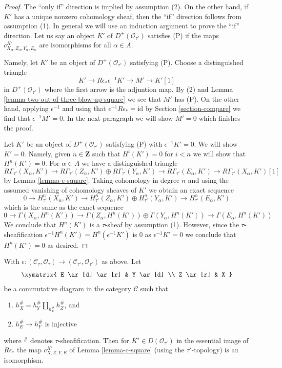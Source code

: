 \begin{proof}
The ``only if'' direction is implied by assumption (2).
On the other hand, if $K'$ has a unique nonzero cohomology sheaf,
then the ``if'' direction follows from assumption (1).
In general we will use an induction argument to prove the
``if'' direction. Let us say an object $K'$ of $D^+(\mathcal{O}_{\tau'})$
satisfies (P) if the maps $c^{K'}_{X_\alpha, Z_\alpha, Y_\alpha, E_\alpha}$
are isomorphisms for all $\alpha \in A$.

\medskip\noindent
Namely, let $K'$ be an object of $D^+(\mathcal{O}_{\tau'})$
satisfying (P). Choose a distinguished triangle
$$
K' \to R\epsilon_*\epsilon^{-1}K' \to M' \to K'[1]
$$
in $D^+(\mathcal{O}_{\tau'})$ where the first arrow is the adjuntion map.
By (2) and Lemma \ref{lemma-two-out-of-three-blow-up-square}
we see that $M'$ has (P). On the other hand, applying
$\epsilon^{-1}$ and using that $\epsilon^{-1}R\epsilon_* = \text{id}$
by Section \ref{section-compare} we find that $\epsilon^{-1}M' = 0$.
In the next paragraph we will show $M' = 0$ which finishes the proof.

\medskip\noindent
Let $K'$ be an object of $D^+(\mathcal{O}_{\tau'})$
satisfying (P) with $\epsilon^{-1}K' = 0$. We will show $K' = 0$.
Namely, given $n \in \mathbf{Z}$ such that $H^i(K') = 0$
for $i < n$ we will show that $H^n(K') = 0$.
For $\alpha \in A$ we have a distinguished triangle
$$
R\Gamma_{\tau'}(X_\alpha, K') \to
R\Gamma_{\tau'}(Z_\alpha, K') \oplus
R\Gamma_{\tau'}(Y_\alpha, K') \to
R\Gamma_{\tau'}(E_\alpha, K') \to
R\Gamma_{\tau'}(X_\alpha, K')[1]
$$
by Lemma \ref{lemma-c-square}. Taking cohomology in degree $n$ and using
the assumed vanishing of cohomology sheaves of $K'$ we obtain an exact
sequence
$$
0 \to
H^n_{\tau'}(X_\alpha, K') \to
H^n_{\tau'}(Z_\alpha, K') \oplus
H^n_{\tau'}(Y_\alpha, K') \to
H^n_{\tau'}(E_\alpha, K')
$$
which is the same as the exact sequence
$$
0 \to
\Gamma(X_\alpha, H^n(K')) \to
\Gamma(Z_\alpha, H^n(K')) \oplus
\Gamma(Y_\alpha, H^n(K')) \to
\Gamma(E_\alpha, H^n(K'))
$$
We conclude that $H^n(K')$ is a $\tau$-sheaf by assumption (1).
However, since the $\tau$-sheafification
$\epsilon^{-1}H^n(K') = H^n(\epsilon^{-1}K')$ is $0$ as
$\epsilon^{-1}K' = 0$
we conclude that $H^n(K') = 0$ as desired.
\end{proof}

\begin{lemma}
\label{lemma-descent-squares-helper}
With $\epsilon : (\mathcal{C}_\tau, \mathcal{O}_\tau) \to
(\mathcal{C}_{\tau'}, \mathcal{O}_{\tau'})$ as above. Let
$$
\xymatrix{
E \ar[d] \ar[r] & Y \ar[d] \\
Z \ar[r] & X
}
$$
be a commutative diagram in the category $\mathcal{C}$ such that
\begin{enumerate}
\item $h_X^\# = h_Y^\# \amalg_{h_E^\#} h_Z^\#$, and
\item $h_E^\# \to h_Y^\#$ is injective
\end{enumerate}
where ${}^\#$ denotes $\tau$-sheafification. Then for
$K' \in D(\mathcal{O}_{\tau'})$ in the essential image of
$R\epsilon_*$ the map $c^{K'}_{X, Z, Y, E}$ of Lemma \ref{lemma-c-square}
(using the $\tau'$-topology) is an isomorphism.
\end{lemma}

